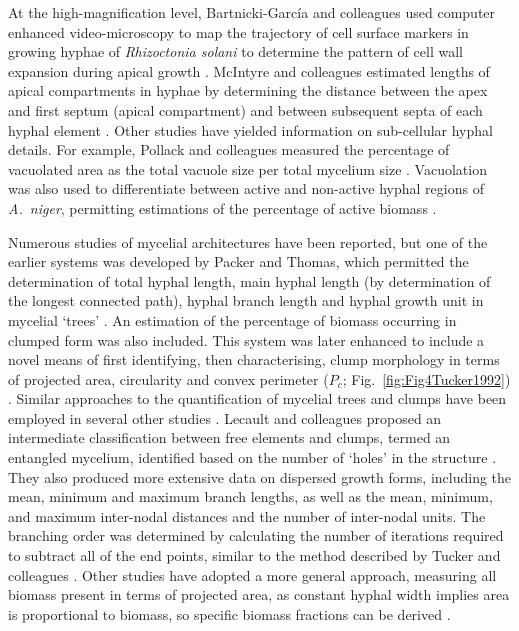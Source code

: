 
At the high-magnification level, Bartnicki-Garc\'{i}a and colleagues used computer enhanced video-microscopy to map the trajectory of cell surface markers in growing hyphae of \emph{Rhizoctonia solani} to determine the pattern of cell wall expansion during apical growth \cite{bartnicki-garcia2000}. McIntyre and colleagues estimated lengths of apical compartments in hyphae by determining the distance between the apex and first septum (apical compartment) and between subsequent septa of each hyphal element \cite{mcintyre2001}. Other studies have yielded information on sub-cellular hyphal details. For example, Pollack and colleagues measured the percentage of vacuolated area as the total vacuole size per total mycelium size \cite{pollack2008}. Vacuolation was also used to differentiate between active and non-active hyphal regions of \emph{A.~niger}, permitting estimations of the percentage of active biomass \cite{wongwicharn1999, wongwicharn1999a}.

Numerous studies of mycelial architectures have been reported, but one of the earlier systems was developed by Packer and Thomas, which permitted the determination of total hyphal length, main hyphal length (by determination of the longest connected path), hyphal branch length and hyphal growth unit in mycelial \lq trees' \cite{packer1990}. An estimation of the percentage of biomass occurring in clumped form was also included. This system was later enhanced to include a novel means of first identifying, then characterising, clump morphology in terms of projected area, circularity and convex perimeter ($P_c$; Fig.~\ref{fig:Fig4Tucker1992}) \cite{tucker1992}. Similar approaches to the quantification of mycelial trees and clumps have been employed in several other studies \cite{elsabbagh2006,mcintyre1998,amanullah2000,li2000}. Lecault and colleagues proposed an intermediate classification between free elements and clumps, termed an entangled mycelium, identified based on the number of \lq holes' in the structure \cite{lecault2007}. They also produced more extensive data on dispersed growth forms, including the mean, minimum and maximum branch lengths, as well as the mean, minimum, and maximum inter-nodal distances and the number of inter-nodal units. The branching order was determined by calculating the number of iterations required to subtract all of the end points, similar to the method described by Tucker and colleagues \cite{tucker1992}. Other studies have adopted a more general approach, measuring all biomass present in terms of projected area, as constant hyphal width implies area is proportional to biomass, so specific biomass fractions can be derived \cite{li2000,bhargava2003,bhargava2003a,bhargava2005}.

